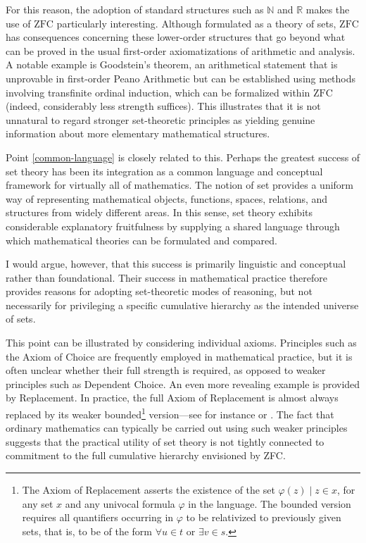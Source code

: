 \documentclass[11pt,a4paper]{article}
\begin{document}
For this reason, the adoption of standard structures such as $\mathbb{N}$ and $\mathbb{R}$ makes the use of $\mathrm{ZFC}$ particularly interesting. Although formulated as a theory of sets, $\mathrm{ZFC}$ has consequences concerning these lower-order structures that go beyond what can be proved in the usual first-order axiomatizations of arithmetic and analysis. A notable example is Goodstein's theorem, an arithmetical statement that is unprovable in first-order Peano Arithmetic but can be established using methods involving transfinite ordinal induction, which can be formalized within $\mathrm{ZFC}$ (indeed, considerably less strength suffices). This illustrates that it is not unnatural to regard stronger set-theoretic principles as yielding genuine information about more elementary mathematical structures.


Point \ref{common-language} is closely related to this. Perhaps the greatest success of set theory has been its integration as a common language and conceptual framework for virtually all of mathematics. The notion of set provides a uniform way of representing mathematical objects, functions, spaces, relations, and structures from widely different areas. In this sense, set theory exhibits considerable explanatory fruitfulness by supplying a shared language through which mathematical theories can be formulated and compared.

I would argue, however, that this success is primarily linguistic and conceptual rather than foundational. Their success in mathematical practice therefore provides reasons for adopting set-theoretic modes of reasoning, but not necessarily for privileging a specific cumulative hierarchy as the intended universe of sets.

This point can be illustrated by considering individual axioms. Principles such as the Axiom of Choice are frequently employed in mathematical practice, but it is often unclear whether their full strength is required, as opposed to weaker principles such as Dependent Choice. An even more revealing example is provided by Replacement. In practice, the full Axiom of Replacement is almost always replaced by its weaker bounded\footnote{The Axiom of Replacement asserts the existence of the set ${\varphi(z)\mid z\in x}$, for any set $x$ and any univocal formula $\varphi$ in the language. The bounded version requires all quantifiers occurring in $\varphi$ to be relativized to previously given sets, that is, to be of the form $\forall u\in t$ or $\exists v\in s$.} version---see for instance \textcite[postnote]{maclane1986mathematics} or \textcite[2]{McLarty2020}. The fact that ordinary mathematics can typically be carried out using such weaker principles suggests that the practical utility of set theory is not tightly connected to commitment to the full cumulative hierarchy envisioned by ZFC.
\end{document}
